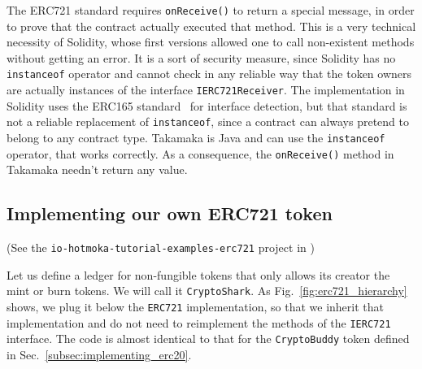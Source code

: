 \begin{commentbox}
The ERC721 standard requires \texttt{onReceive()} to return a special message, in order
to prove that the contract actually executed that method. This is a very technical
necessity of Solidity, whose first versions allowed one to call non-existent methods
without getting an error. It is a sort of security measure, since Solidity
has no \texttt{instanceof} operator and cannot check in any reliable
way that the token owners are actually instances of the interface \texttt{IERC721Receiver}.
The implementation in Solidity uses the ERC165
standard~\cite{ReitwiessnerJVBFE18} for interface detection,
but that standard is not a reliable replacement of \texttt{instanceof},
since a contract can always pretend to belong to any contract type.
Takamaka is Java and can use the \texttt{instanceof} operator, that works correctly.
As a consequence, the \texttt{onReceive()} method in Takamaka needn't return any value.
\end{commentbox}

\subsection{Implementing our own ERC721 token}\label{subsec:implementing_erc721}

\begin{center}
(See the \texttt{io-hotmoka-tutorial-examples-erc721} project in \hotmokaRepo{})
\end{center}

Let us define a ledger for non-fungible tokens
that only allows its creator the mint or burn tokens.
We will call it \texttt{CryptoShark}. As Fig.~\ref{fig:erc721_hierarchy} shows,
we plug it below the \texttt{ERC721} implementation, so that we inherit that implementation
and do not need to reimplement the methods of the \texttt{IERC721} interface.
The code is almost identical to that for the \texttt{CryptoBuddy} token defined
in Sec.~\ref{subsec:implementing_erc20}.

